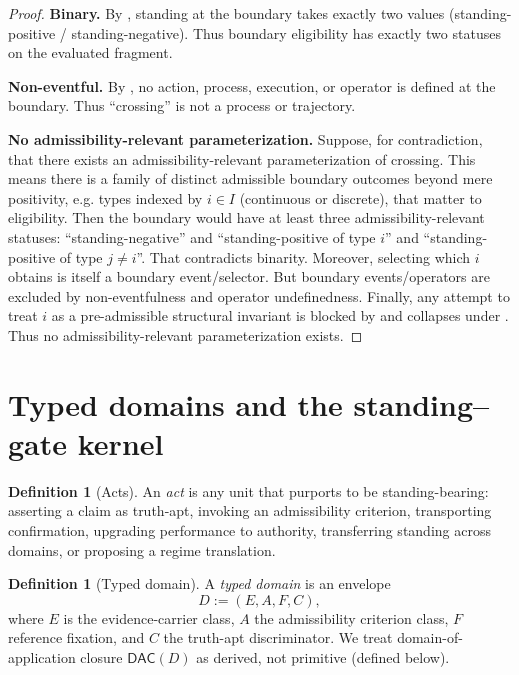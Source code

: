 \documentclass[11pt]{article}
\theoremstyle{definition}
\newtheorem{definition}[theorem]{Definition}
\newcommand{\DAC}{\mathsf{DAC}}
\begin{document}
\begin{proof}
\textbf{Binary.} By , standing at the boundary takes exactly two values (standing-positive / standing-negative).
Thus boundary eligibility has exactly two statuses on the evaluated fragment.

\textbf{Non-eventful.} By , no action, process, execution, or operator is defined at the boundary.
Thus ``crossing'' is not a process or trajectory.

\textbf{No admissibility-relevant parameterization.}
Suppose, for contradiction, that there exists an admissibility-relevant parameterization of crossing.
This means there is a family of distinct admissible boundary outcomes beyond mere positivity, e.g. types indexed by $i\in I$ (continuous or discrete), that matter to eligibility.
Then the boundary would have at least three admissibility-relevant statuses: ``standing-negative'' and ``standing-positive of type $i$'' and ``standing-positive of type $j\neq i$''.
That contradicts binarity.
Moreover, selecting which $i$ obtains is itself a boundary event/selector.
But boundary events/operators are excluded by non-eventfulness and operator undefinedness.
Finally, any attempt to treat $i$ as a pre-admissible structural invariant is blocked by  and collapses under .
Thus no admissibility-relevant parameterization exists.
\end{proof}

\section{Typed domains and the standing--gate kernel}
\label{sec:typed}

\begin{definition}[Acts]
An \emph{act} is any unit that purports to be standing-bearing: asserting a claim as truth-apt, invoking an admissibility criterion, transporting confirmation, upgrading performance to authority, transferring standing across domains, or proposing a regime translation.
\end{definition}

\begin{definition}[Typed domain]
A \emph{typed domain} is an envelope
\[ D := (E, A, F, C), \]
where $E$ is the evidence-carrier class, $A$ the admissibility criterion class, $F$ reference fixation, and $C$ the truth-apt discriminator.
We treat domain-of-application closure $\DAC(D)$ as derived, not primitive (defined below).
\end{definition}
\end{document}
